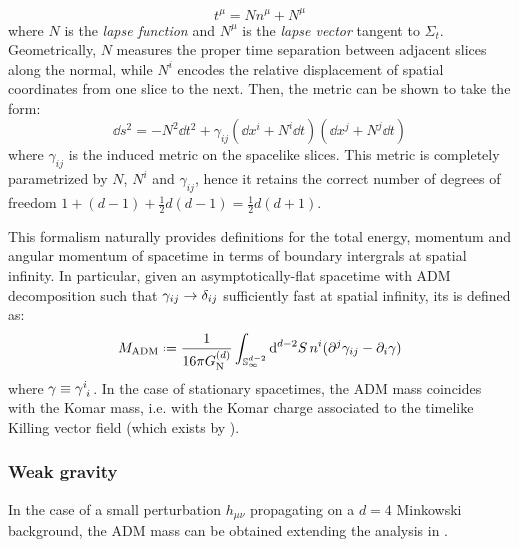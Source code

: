 \begin{equation*}
  t^\mu = N n^\mu + N^\mu
\end{equation*}
where $ N $ is the \emph{lapse function} and $ N^\mu $ is the \emph{lapse vector} tangent to $ \Sigma_t $. Geometrically, $ N $ measures the proper time separation between adjacent slices along the normal, while $ N^i $ encodes the relative displacement of spatial coordinates from one slice to the next. Then, the metric can be shown to take the form:
\begin{equation}
  \dd s^2 = - N^2 \dd t^2 + \gamma_{ij} (\dd x^i + N^i \dd t) (\dd x^j + N^j \dd t)
  \label{eq:adm-metric}
\end{equation}
where $ \gamma_{ij} $ is the induced metric on the spacelike slices. This metric is completely parametrized by $ N $, $ N^i $ and $ \gamma_{ij} $, hence it retains the correct number of degrees of freedom $ 1 + (d-1) + \frac{1}{2} d (d-1) = \frac{1}{2} d (d+1) $.

This formalism naturally provides definitions for the total energy, momentum and angular momentum of spacetime in terms of boundary intergrals at spatial infinity. In particular, given an asymptotically-flat spacetime with ADM decomposition  such that $ \gamma_{ij} \rightarrow \delta_{ij} $ sufficiently fast at spatial infinity, its  is defined as:
\begin{equation}
  M_\text{ADM} \defeq \frac{1}{16 \pi \gd} \int_{\Sn{d-2}_\infty} \dd^{d-2}S \, n^i (\pa^j \gamma_{ij} - \pa_i \gamma)
  \label{eq:adm-mass}
\end{equation}
where $ \gamma \equiv \tensor{\gamma}{^i_i} $. In the case of stationary spacetimes, the ADM mass coincides with the Komar mass, i.e. with the Komar charge  associated to the timelike Killing vector field (which exists by ).

\subsubsection{Weak gravity}

In the case of a small perturbation $ h_{\mu \nu} $ propagating on a $ d = 4 $ Minkowski background, the ADM mass  can be obtained extending the analysis in .


